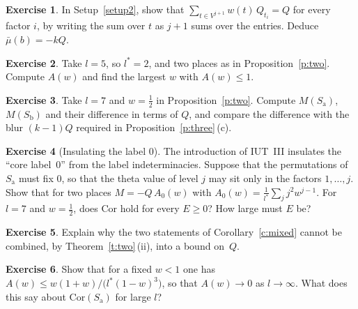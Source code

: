 \documentclass[11pt,a4paper]{article}
\newcommand{\Sa}{S_{\mathrm a}}
\newcommand{\Sb}{S_{\mathrm b}}
\theoremstyle{plain}
\theoremstyle{definition}
\newtheorem{exercise}{Exercise}
\theoremstyle{remark}
\begin{document}
\begin{exercise}
In Setup~\ref{setup2}, show that $\sum_{t\in V^{j+1}}w(t)\,Q_{t_i}=Q$ for every factor $i$, by writing the sum over $t$
as $j+1$ sums over the entries. Deduce $\bar\mu(b)=-kQ$.
\end{exercise}
\begin{exercise}
Take $l=5$, so $l^*=2$, and two places as in Proposition~\ref{p:two}. Compute $A(w)$ and find the largest $w$ with
$A(w)\le1$.
\end{exercise}
\begin{exercise}
Take $l=7$ and $w=\frac12$ in Proposition~\ref{p:two}. Compute $M(\Sa)$, $M(\Sb)$ and their difference in terms of
$Q$, and compare the difference with the blur $(k-1)Q$ required in Proposition~\ref{p:three}\,(c).
\end{exercise}
\begin{exercise}[Insulating the label $0$]
The introduction of IUT~III insulates the ``core label~0'' from the label indeterminacies. Suppose that the
permutations of $\Sa$ must fix $0$, so that the theta value of level $j$ may sit only in the factors $1,\dots,j$. Show
that for two places $M=-Q\,A_0(w)$ with $A_0(w)=\frac1{l^*}\sum_jj^2w^{j-1}$. For $l=7$ and $w=\frac12$, does
$\mathrm{Cor}$ hold for every $E\ge0$? How large must $E$ be?
\end{exercise}
\begin{exercise}
Explain why the two statements of Corollary~\ref{c:mixed} cannot be combined, by Theorem~\ref{t:two}\,(ii), into a
bound on~$Q$.
\end{exercise}
\begin{exercise}
Show that for a fixed $w<1$ one has $A(w)\le w(1+w)/\bigl(l^*(1-w)^3\bigr)$, so that $A(w)\to0$ as $l\to\infty$. What
does this say about $\mathrm{Cor}(\Sa)$ for large $l$?
\end{exercise}
\end{document}
